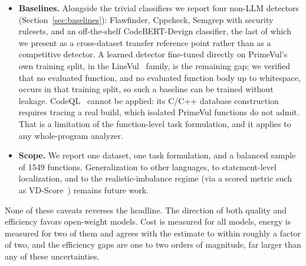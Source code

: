 \documentclass[computers,article,submit,moreauthors]{Definitions/mdpi}
\begin{document}
\begin{itemize}
What the dispersion does affect is the \emph{cost} axis, where a 14-fold price spread is a market fact rather than a model property (Section~\ref{sec:methods}), and reliability. We encountered two distinct serving faults, both silent. One provider billed output tokens while returning empty content, which an unpinned run would have scored as a model parse failure. Another accepted a request to enable reasoning, returned HTTP 200, and did not enable it, producing an arm that measured direct answering under a reasoning label (Section~\ref{sec:families}); the gateway's capability metadata listed that provider as supporting the parameter.

Neither fault raises an error, and neither is visible in the response itself. The lesson we draw, and the one we would offer to anyone benchmarking through a gateway, is that pinning a provider buys reproducible pricing and numerics but not a guarantee that the configuration you asked for was applied. Detecting a silent no-op requires an independent expectation to check against --- in our case an output-length distribution from an earlier epoch, without which the arm would have entered the paper as a finding about the model. All runs reported here pin the provider with fallbacks disabled, log the provider actually used, and record per-row token counts (Appendix~\ref{app:repro}), which is the minimum needed to notice this class of failure at all.
\item \textbf{Baselines.} Alongside the trivial classifiers we report four non-LLM detectors (Section~\ref{sec:baselines}): Flawfinder, Cppcheck, Semgrep with security rulesets, and an off-the-shelf CodeBERT-Devign classifier, the last of which we present as a cross-dataset transfer reference point rather than as a competitive detector. A learned detector fine-tuned directly on PrimeVul's own training split, in the LineVul~\citep{linevul} family, is the remaining gap; we verified that no evaluated function, and no evaluated function body up to whitespace, occurs in that training split, so such a baseline can be trained without leakage. CodeQL~\citep{codeql} cannot be applied: its C/C++ database construction requires tracing a real build, which isolated PrimeVul functions do not admit. That is a limitation of the function-level task formulation, and it applies to any whole-program analyzer.
\item \textbf{Scope.} We report one dataset, one task formulation, and a balanced sample of 1549 functions. Generalization to other languages, to statement-level localization, and to the realistic-imbalance regime (via a scored metric such as VD-Score~\citep{primevul}) remains future work.
\end{itemize}
None of these caveats reverses the headline. The direction of both quality and efficiency favors open-weight models. Cost is measured for all models, energy is measured for two of them and agrees with the estimate to within roughly a factor of two, and the efficiency gaps are one to two orders of magnitude, far larger than any of these uncertainties.
\end{document}
